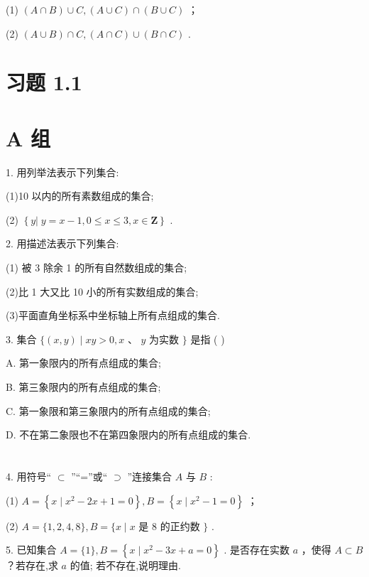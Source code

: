 \documentclass[10pt]{article}
\begin{document}
(1) \(\left( {A \cap  B}\right)  \cup  C,\left( {A \cup  C}\right)  \cap  \left( {B \cup  C}\right)\) ；

(2) \(\left( {A \cup  B}\right)  \cap  C,\left( {A \cap  C}\right)  \cup  \left( {B \cap  C}\right)\) .

\section*{习题 1.1}

\section*{A 组}

1. 用列举法表示下列集合:

(1)10 以内的所有素数组成的集合;

(2) \(\left\{  {y\left| {\;y = x - 1}\right. ,0 \leq  x \leq  3,x \in  \mathbf{Z}}\right\}\) .

2. 用描述法表示下列集合:

(1) 被 3 除余 1 的所有自然数组成的集合;

(2)比 1 大又比 10 小的所有实数组成的集合;

(3)平面直角坐标系中坐标轴上所有点组成的集合.

3. 集合 \(\{ \left( {x,y}\right)  \mid  {xy} > 0,x\text{ 、 }y\) 为实数 \(\}\) 是指 ( )

A. 第一象限内的所有点组成的集合;

B. 第三象限内的所有点组成的集合;

C. 第一象限和第三象限内的所有点组成的集合;

D. 不在第二象限也不在第四象限内的所有点组成的集合.



\section*{}

4. 用符号“ \(\subset\) ”“=”或“ \(\supset\) ”连接集合 \(A\) 与 \(B\) :

(1) \(A = \left\{  {x \mid  {x}^{2} - {2x} + 1 = 0}\right\}  ,B = \left\{  {x \mid  {x}^{2} - 1 = 0}\right\}\) ；

(2) \(A = \{ 1,2,4,8\} ,B = \{ x \mid  x\) 是 8 的正约数 \(\}\) .

5. 已知集合 \(A = \{ 1\} ,B = \left\{  {x \mid  {x}^{2} - {3x} + a = 0}\right\}\) . 是否存在实数 \(a\) ，使得 \(A \subset  B\) ？若存在,求 \(a\) 的值; 若不存在,说明理由.
\end{document}
